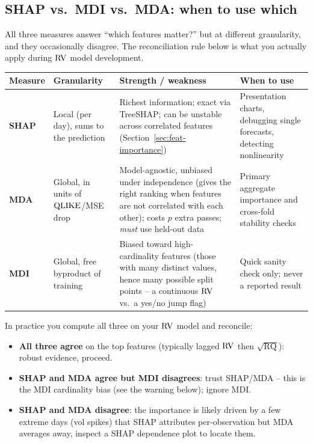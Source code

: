 \subsection{SHAP vs.\ MDI vs.\ MDA: when to use which}

All three measures answer ``which features matter?'' but at different
granularity, and they occasionally disagree.  The reconciliation rule below
is what you actually apply during $\operatorname{RV}$ model development.

\begin{center}
\renewcommand{\arraystretch}{1.3}
\begin{tabular}{@{}p{2.0cm}p{2.2cm}p{4.6cm}p{4.4cm}@{}}
\toprule
\textbf{Measure} & \textbf{Granularity} & \textbf{Strength / weakness} & \textbf{When to use} \\
\midrule
\textbf{SHAP}
  & Local (per day), sums to the prediction
  & Richest information; exact via TreeSHAP; can be unstable across
    correlated features (Section~\ref{sec:feat-importance})
  & Presentation charts, debugging single forecasts, detecting
    nonlinearity \\[4pt]
\textbf{MDA}
  & Global, in units of $\operatorname{QLIKE}$/MSE drop
  & Model-agnostic, unbiased under independence (gives the right ranking when
    features are not correlated with each other); costs $p$ extra passes;
    \emph{must} use held-out data
  & Primary aggregate importance and cross-fold stability checks \\[4pt]
\textbf{MDI}
  & Global, free byproduct of training
  & Biased toward high-cardinality features (those with many distinct values,
    hence many possible split points -- a continuous $\operatorname{RV}$ vs.\ a yes/no jump
    flag) \citep{StroblBoulesteixZeileisHothorn2007}
  & Quick sanity check only; never a reported result \\
\bottomrule
\end{tabular}
\end{center}

In practice you compute all three on your $\operatorname{RV}$ model and reconcile:
\begin{itemize}[leftmargin=1.8em]
  \item \textbf{All three agree} on the top features (typically lagged
        $\operatorname{RV}$ then $\sqrt{\operatorname{RQ}}$): robust evidence, proceed.
  \item \textbf{SHAP and MDA agree but MDI disagrees}: trust SHAP/MDA -- this
        is the MDI cardinality bias (see the warning below); ignore MDI.
  \item \textbf{SHAP and MDA disagree}: the importance is likely driven by a
        few extreme days (vol spikes) that SHAP attributes per-observation
        but MDA averages away, inspect a SHAP dependence plot to locate
        them.
\end{itemize}

